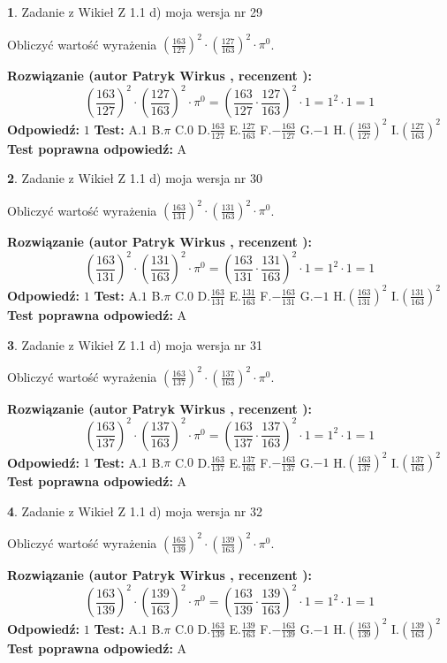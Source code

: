 \documentclass[12pt, a4paper]{article}
\theoremstyle{definition} %
\newtheorem{zad}{}
\newcommand{\zadStart}[1]{\begin{zad}#1\newline}
\newcommand{\zadStop}{\end{zad}}
\newcommand{\rozwStart}[2]{\noindent \textbf{Rozwiązanie (autor #1 , recenzent #2): }\newline}
\newcommand{\rozwStop}{\newline}
\newcommand{\odpStart}{\noindent \textbf{Odpowiedź:}\newline}
\newcommand{\odpStop}{\newline}
\newcommand{\testStart}{\noindent \textbf{Test:}\newline}
\newcommand{\testStop}{\newline}
\newcommand{\kluczStart}{\noindent \textbf{Test poprawna odpowiedź:}\newline}
\newcommand{\kluczStop}{\newline}
\begin{document}
\zadStart{Zadanie z Wikieł Z 1.1 d) moja wersja nr 29}

Obliczyć wartość wyrażenia $(\frac{163}{127})^{2} \cdot (\frac{127}{163})^{2} \cdot \pi^{0}$.
\zadStop
\rozwStart{Patryk Wirkus}{}
$$(\frac{163}{127})^{2} \cdot (\frac{127}{163})^{2} \cdot \pi^{0} = (\frac{163}{127} \cdot \frac{127}{163})^{2} \cdot 1 = 1^{2} \cdot 1 = 1$$
\rozwStop
\odpStart
$1$
\odpStop
\testStart
A.$1$ B.$\pi$ C.$0$ D.$\frac{163}{127}$ E.$\frac{127}{163}$
F.$-\frac{163}{127}$ G.$-1$
H.$(\frac{163}{127})^{2}$
I.$(\frac{127}{163})^{2}$
\testStop
\kluczStart
A
\kluczStop



\zadStart{Zadanie z Wikieł Z 1.1 d) moja wersja nr 30}

Obliczyć wartość wyrażenia $(\frac{163}{131})^{2} \cdot (\frac{131}{163})^{2} \cdot \pi^{0}$.
\zadStop
\rozwStart{Patryk Wirkus}{}
$$(\frac{163}{131})^{2} \cdot (\frac{131}{163})^{2} \cdot \pi^{0} = (\frac{163}{131} \cdot \frac{131}{163})^{2} \cdot 1 = 1^{2} \cdot 1 = 1$$
\rozwStop
\odpStart
$1$
\odpStop
\testStart
A.$1$ B.$\pi$ C.$0$ D.$\frac{163}{131}$ E.$\frac{131}{163}$
F.$-\frac{163}{131}$ G.$-1$
H.$(\frac{163}{131})^{2}$
I.$(\frac{131}{163})^{2}$
\testStop
\kluczStart
A
\kluczStop



\zadStart{Zadanie z Wikieł Z 1.1 d) moja wersja nr 31}

Obliczyć wartość wyrażenia $(\frac{163}{137})^{2} \cdot (\frac{137}{163})^{2} \cdot \pi^{0}$.
\zadStop
\rozwStart{Patryk Wirkus}{}
$$(\frac{163}{137})^{2} \cdot (\frac{137}{163})^{2} \cdot \pi^{0} = (\frac{163}{137} \cdot \frac{137}{163})^{2} \cdot 1 = 1^{2} \cdot 1 = 1$$
\rozwStop
\odpStart
$1$
\odpStop
\testStart
A.$1$ B.$\pi$ C.$0$ D.$\frac{163}{137}$ E.$\frac{137}{163}$
F.$-\frac{163}{137}$ G.$-1$
H.$(\frac{163}{137})^{2}$
I.$(\frac{137}{163})^{2}$
\testStop
\kluczStart
A
\kluczStop



\zadStart{Zadanie z Wikieł Z 1.1 d) moja wersja nr 32}

Obliczyć wartość wyrażenia $(\frac{163}{139})^{2} \cdot (\frac{139}{163})^{2} \cdot \pi^{0}$.
\zadStop
\rozwStart{Patryk Wirkus}{}
$$(\frac{163}{139})^{2} \cdot (\frac{139}{163})^{2} \cdot \pi^{0} = (\frac{163}{139} \cdot \frac{139}{163})^{2} \cdot 1 = 1^{2} \cdot 1 = 1$$
\rozwStop
\odpStart
$1$
\odpStop
\testStart
A.$1$ B.$\pi$ C.$0$ D.$\frac{163}{139}$ E.$\frac{139}{163}$
F.$-\frac{163}{139}$ G.$-1$
H.$(\frac{163}{139})^{2}$
I.$(\frac{139}{163})^{2}$
\testStop
\kluczStart
A
\kluczStop
\end{document}
